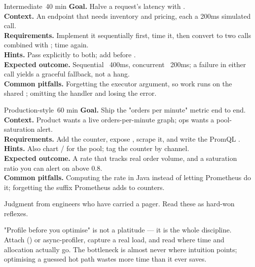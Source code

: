 \begin{minilab}{Intermediate}{~40 min}
\textbf{Goal.} Halve a request's latency with .\\
\textbf{Context.} An endpoint that needs inventory and pricing, each a 200ms simulated call.\\
\textbf{Requirements.} Implement it sequentially first, time it, then convert to two  calls combined with ; time again.\\
\textbf{Hints.} Pass  explicitly to both; add  before .\\
\textbf{Expected outcome.} Sequential ~400ms, concurrent ~200ms; a failure in either call yields a graceful fallback, not a hang.\\
\textbf{Common pitfalls.} Forgetting the executor argument, so work runs on the shared ; omitting the handler and losing the error.
\end{minilab}

\begin{minilab}{Production-style}{~60 min}
\textbf{Goal.} Ship the "orders per minute" metric end to end.\\
\textbf{Context.} Product wants a live orders-per-minute graph; ops wants a pool-saturation alert.\\
\textbf{Requirements.} Add the  counter, expose , scrape it, and write the PromQL .\\
\textbf{Hints.} Also chart  /  for the pool; tag the counter by channel.\\
\textbf{Expected outcome.} A rate that tracks real order volume, and a saturation ratio you can alert on above 0.8.\\
\textbf{Common pitfalls.} Computing the rate in Java instead of letting Prometheus do it; forgetting the  suffix Prometheus adds to counters.
\end{minilab}


Judgment from engineers who have carried a pager. Read these as hard-won reflexes.

\begin{perfnote}
"Profile before you optimise" is not a platitude --- it is the whole discipline. Attach  () or async-profiler, capture a real load, and read where time and allocation actually go. The bottleneck is almost never where intuition points; optimising a guessed hot path wastes more time than it ever saves.
\end{perfnote}

